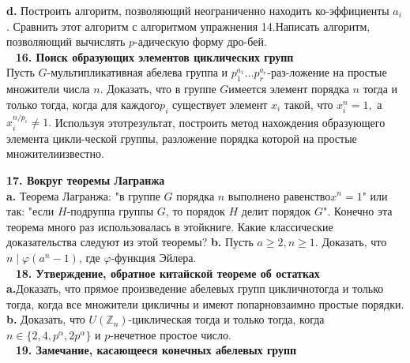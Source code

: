 \documentclass{mai_book}
\begin{document}
\hspace*{15pt}\textbf{d.} Построить алгоритм, позволяющий неограниченно находить ко-\newline эффициенты $a_i$. Сравнить этот алгоритм с алгоритмом упражнения 14.\newline Написать алгоритм, позволяющий вычислять $p$-адическую форму дро-\newline бей.\\
\ \newline
\noindent\textbf{16. Поиск образующих элементов циклических групп}\\

    Пусть $G$-мультипликативная абелева группа и $p_1^{a_1}\ldots p_r^{a_r}$-раз-\newline ложение на простые множители числа $n$. Доказать, что в группе $G$\newline имеется элемент порядка $n$ тогда и только тогда, когда для каждого\newline $p_i$ существует элемент $x_i$ такой, что $x_i^n=1,$ а $x_i^{n/p_i}\neq 1.$ Используя этот\newline результат, построить метод нахождения образующего элемента цикли-\newline ческой группы, разложение порядка которой на простые множители\newline известно.\newline
     
\newpage

\noindent\textbf{17. Вокруг теоремы Лагранжа}\\

        \textbf{a.} Теорема Лагранжа: "в группе $G$ порядка $n$ выполнено равенство\newline $x^n=1$" или так: "если $H$-подруппа группы $G$, то порядок $H$ делит порядок $G$". Конечно эта теорема много раз использовалась в этой\newline книге. Какие классические доказательства следуют из этой теоремы?\newline
\hspace*{15pt}\textbf{b.} Пусть $a\geqslant 2, n\geqslant 1.$ Доказать, что $n\mid \varphi(a^n-1)$, где $\varphi$-функция Эйлера.\\
\ \newline
\noindent\textbf{18. Утверждение, обратное китайской теореме об остатках}\\

	\textbf{a.}Доказать, что прямое произведение абелевых групп циклично\newline тогда и только тогда, когда все множители цикличны и имеют попарно\newline взаимно простые порядки.\newline
\hspace*{15pt}\textbf{b.} Доказать, что $U(\mathbb{Z}_n)$-циклическая тогда и только тогда, когда\newline $n\in \{2,4,p^\alpha,2p^\alpha\}$ и $p$-нечетное простое число.\\
\ \newline
\noindent\textbf{19. Замечание, касающееся конечных абелевых групп}\\
\end{document}
